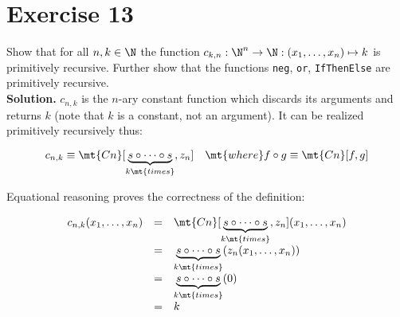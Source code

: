 \section{Exercise 13}

Show that for all $n,k \in \N$ the function $c_{k,n} : \N^n \rightarrow \N : (x_1,\dots,x_n) \mapsto k$ is primitively recursive. Further show that the functions \texttt{neg}, \texttt{or}, \texttt{IfThenElse} are primitively recursive.\\

\noindent
\textbf{Solution.} $c_{n,k}$ is the $n$-ary constant function which discards its arguments and returns $k$ (note that $k$ is a constant, not an argument). It can be realized primitively recursively thus:

$$
	c_{n,k} \equiv \mt{Cn}[\underset{k \mt{ times}}{\underbrace{s \circ \dots \circ s}},z_n] \quad \mt{where } f \circ g \equiv \mt{Cn}[f,g]
$$

Equational reasoning proves the correctness of the definition:

$$
	\begin{array}{l l l}
	c_{n,k}(x_1,\dots,x_n) & = & \mt{Cn}[\underset{k \mt{ times}}{\underbrace{s \circ \dots \circ s}},z_n] (x_1,\dots,x_n)\\
			& = & \underset{k \mt{ times}}{\underbrace{s \circ \dots \circ s}}(z_n(x_1,\dots,x_n))\\
			& = & \underset{k \mt{ times}}{\underbrace{s \circ \dots \circ s}}(0)\\
			& = & k
	\end{array}
$$

